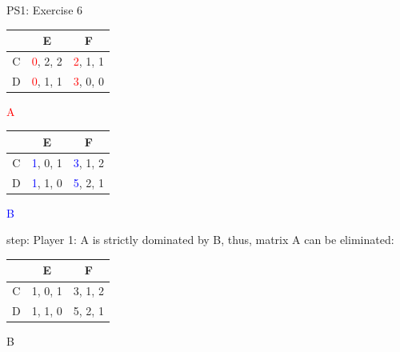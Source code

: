 \begin{frame}{PS1: Exercise 6}
\begin{multicols}{2}
\begin{table}
  \begin{tabular}{c|c|c}
      & E       & F       \\
    \midrule
    C & \textcolor{red}{0}, 2, 2 & \textcolor{red}{2}, 1, 1 \\
    \midrule
    D & \textcolor{red}{0}, 1, 1 & \textcolor{red}{3}, 0, 0
  \end{tabular}
  \center \textcolor{red}{A}
\end{table}
\vfill\null \columnbreak
\begin{table}
  \begin{tabular}{c|c|c}
      & E       & F       \\
    \midrule
    C & \textcolor{blue}{1}, 0, 1 & \textcolor{blue}{3}, 1, 2 \\
    \midrule
    D & \textcolor{blue}{1}, 1, 0 & \textcolor{blue}{5}, 2, 1
  \end{tabular}
  \center \textcolor{blue}{B}
\end{table}
\end{multicols}
 step: Player 1: A is strictly dominated by B, thus, matrix A can be eliminated:
\begin{multicols}{2}
\vfill\null \columnbreak
\begin{table}
  \begin{tabular}{c|c|c}
      & E       & F       \\
    \midrule
    C & 1, 0, 1 & 3, 1, 2 \\
    \midrule
    D & 1, 1, 0 & 5, 2, 1
  \end{tabular}
  \center B
\end{table}
\vfill\null
\end{multicols}
\end{frame}

